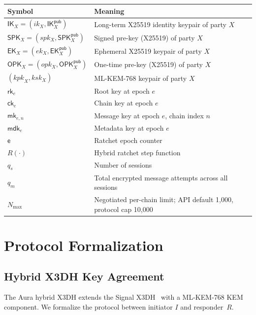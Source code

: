 \documentclass[11pt,a4paper]{article}
\theoremstyle{definition}
\theoremstyle{remark}
\newcommand{\IK}{\mathsf{IK}}
\newcommand{\SPK}{\mathsf{SPK}}
\newcommand{\EK}{\mathsf{EK}}
\newcommand{\OPK}{\mathsf{OPK}}
\newcommand{\rk}{\mathsf{rk}}
\newcommand{\ck}{\mathsf{ck}}
\newcommand{\mk}{\mathsf{mk}}
\newcommand{\mdk}{\mathsf{mdk}}
\newcommand{\epoch}{\mathsf{e}}
\begin{document}
\begin{center}
\renewcommand{\arraystretch}{1.25}
\begin{tabular}{@{}ll@{}}
\toprule
\textbf{Symbol} & \textbf{Meaning} \\
\midrule
$\IK_X = (ik_X, \IK_X^{\mathsf{pub}})$ & Long-term X25519 identity keypair of party $X$ \\
$\SPK_X = (spk_X, \SPK_X^{\mathsf{pub}})$ & Signed pre-key (X25519) of party $X$ \\
$\EK_X = (ek_X, \EK_X^{\mathsf{pub}})$ & Ephemeral X25519 keypair of party $X$ \\
$\OPK_X = (opk_X, \OPK_X^{\mathsf{pub}})$ & One-time pre-key (X25519) of party $X$ \\
$(\mathit{kpk}_X, \mathit{ksk}_X)$ & ML-KEM-768 keypair of party $X$ \\
$\rk_e$ & Root key at epoch $e$ \\
$\ck_e$ & Chain key at epoch $e$ \\
$\mk_{e,n}$ & Message key at epoch $e$, chain index $n$ \\
$\mdk_e$ & Metadata key at epoch $e$ \\
$\epoch$ & Ratchet epoch counter \\
$R(\cdot)$ & Hybrid ratchet step function \\
$q_s$ & Number of sessions \\
$q_m$ & Total encrypted message attempts across all sessions \\
$N_{\max}$ & Negotiated per-chain limit; API default 1{,}000, protocol cap 10{,}000 \\
\bottomrule
\end{tabular}
\end{center}


\section{Protocol Formalization}
\label{sec:protocol}

\subsection{Hybrid X3DH Key Agreement}
\label{subsec:x3dh}

The Aura hybrid X3DH extends the Signal X3DH~\cite{signal-x3dh} with a
ML-KEM-768 KEM component.  We formalize the protocol between initiator $I$ and
responder~$R$.
\end{document}
